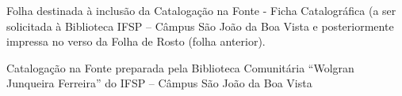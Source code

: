 %
%     

\begin{fichacatalografica}
	
	Folha destinada à inclusão da Catalogação na Fonte - Ficha Catalográfica (a ser solicitada à Biblioteca IFSP – Câmpus São João da Boa Vista e posteriormente impressa no verso da Folha de Rosto (folha anterior).
	
	\vspace{3cm}
	
	\begin{center}
		Catalogação na Fonte preparada pela Biblioteca Comunitária “Wolgran Junqueira Ferreira” do IFSP – Câmpus São João da Boa Vista
	\end{center}
	
	
	\sffamily
	\vspace*{\fill}					%
	\begin{center}					%
	\end{center}
\end{fichacatalografica}
